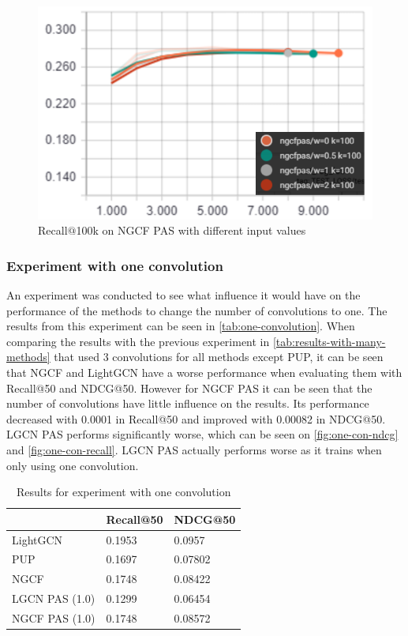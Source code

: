 \begin{figure}
    \includegraphics[width=\linewidth]{figures/graphs/recall-ngcfpas-weights.png}
    \caption{Recall$@$100k on NGCF PAS with different input values}
    \label{fig:recall-ngcfpas-weights}
\end{figure}

\subsubsection{Experiment with one convolution}
An experiment was conducted to see what influence it would have on the performance of the methods to change the number of convolutions to one.
The results from this experiment can be seen in \autoref{tab:one-convolution}.
When comparing the results with the previous experiment in \autoref{tab:results-with-many-methods} that used 3 convolutions for all methods except PUP, it can be seen that NGCF and LightGCN have a worse performance when evaluating them with Recall@50 and NDCG@50.
However for NGCF PAS it can be seen that the number of convolutions have little influence on the results.
Its performance decreased with 0.0001 in Recall@50 and improved with 0.00082 in NDCG@50.
LGCN PAS performs significantly worse, which can be seen on \autoref{fig:one-con-ndcg} and \autoref{fig:one-con-recall}.
LGCN PAS actually performs worse as it trains when only using one convolution.
\begin{table}[]
    \centering
    \begin{tabular}{|l|l|l|}
        \hline
        \rowcolor[HTML]{FFFFFF}
                       & Recall@50 & NDCG@50 \\ \hline
        LightGCN       & 0.1953    & 0.0957  \\ \hline
        PUP            & 0.1697    & 0.07802 \\ \hline
        NGCF           & 0.1748    & 0.08422 \\ \hline
        LGCN PAS (1.0) & 0.1299    & 0.06454 \\ \hline
        NGCF PAS (1.0) & 0.1748    & 0.08572 \\ \hline
    \end{tabular}
    \caption{Results for experiment with one convolution}
    \label{tab:one-convolution}
\end{table}

